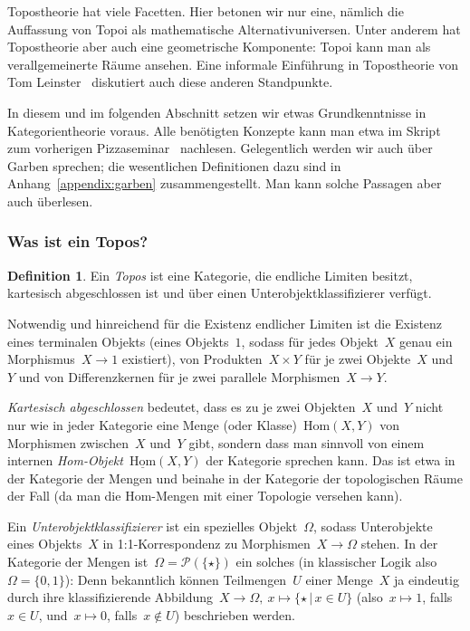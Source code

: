 \documentclass[a4paper,ngerman,12pt]{scrartcl}
\theoremstyle{definition}
\newtheorem{defn}{Definition}[section]
\theoremstyle{plain}
\theoremstyle{remark}
\renewcommand{\P}{\mathcal{P}}
\newcommand{\Hom}{\mathrm{Hom}}
\renewcommand{\_}{\mathpunct{.}\,}
\newcommand{\?}{\,{:}\,}
\begin{document}
Topostheorie hat viele Facetten. Hier betonen wir nur eine, nämlich
die Auffassung von Topoi als mathematische Alternativuniversen. Unter anderem
hat Topostheorie aber auch eine geometrische Komponente: Topoi kann man als
verallgemeinerte Räume ansehen. Eine informale Einführung in Topostheorie
von Tom Leinster~\cite{leinster:topos} diskutiert auch diese anderen
Standpunkte.

In diesem und im folgenden Abschnitt setzen wir etwas Grundkenntnisse in
Kategorientheorie voraus. Alle benötigten Konzepte kann man etwa im
Skript zum vorherigen Pizzaseminar~\cite{pizzaseminar:kategorientheorie}
nachlesen. Gelegentlich werden wir auch über Garben sprechen; die wesentlichen
Definitionen dazu sind in Anhang~\ref{appendix:garben} zusammengestellt. Man
kann solche Passagen aber auch überlesen.


\subsubsection*{Was ist ein Topos?}

\begin{defn}Ein \emph{Topos} ist eine Kategorie, die endliche Limiten besitzt,
kartesisch abgeschlossen ist und über einen Unterobjektklassifizierer verfügt.
\end{defn}

Notwendig und hinreichend für die Existenz endlicher Limiten ist die Existenz
eines terminalen Objekts (eines Objekts~$1$, sodass für jedes Objekt~$X$ genau
ein Morphismus~$X \to 1$ existiert), von Produkten~$X \times Y$ für je zwei
Objekte~$X$ und~$Y$ und von Differenzkernen für je zwei parallele Morphismen~$X
\to Y$.

\emph{Kartesisch abgeschlossen} bedeutet, dass es zu je zwei Objekten~$X$
und~$Y$ nicht nur wie in jeder Kategorie eine Menge (oder Klasse)~$\Hom(X,Y)$
von Morphismen zwischen~$X$ und~$Y$ gibt, sondern dass man sinnvoll von einem
internen \emph{Hom-Objekt}~$\underline{\Hom}(X,Y)$ der Kategorie sprechen kann.
Das ist etwa in der Kategorie der Mengen und beinahe in der Kategorie der
topologischen Räume der Fall (da man die Hom-Mengen mit einer Topologie
versehen kann).

Ein \emph{Unterobjektklassifizierer} ist ein spezielles Objekt~$\Omega$, sodass
Unterobjekte eines Objekts~$X$ in 1:1-Korrespondenz zu Morphismen~$X \to
\Omega$ stehen. In der Kategorie der Mengen ist~$\Omega = \P(\{\star\})$ ein solches (in
klassischer Logik also~$\Omega = \{ 0, 1 \}$): Denn bekanntlich
können Teilmengen~$U$ einer Menge~$X$ ja eindeutig durch ihre klassifizierende
Abbildung~$X \to \Omega,\ x \mapsto \{ \star \,|\, x \in U \}$ (also~$x \mapsto
1$, falls~$x \in U$, und~$x \mapsto 0$, falls~$x \not\in U$) beschrieben
werden.
\end{document}

